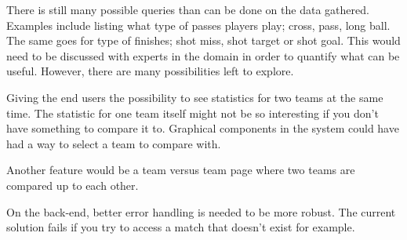 There is still many possible queries than can be done on the data gathered. Examples include listing what type of passes players play; cross, pass, long ball. The same goes for type of finishes; shot miss, shot target or shot goal. This would need to be discussed with experts in the domain in order to quantify what can be useful. However, there are many possibilities left to explore. 

Giving the end users the possibility to see statistics for two teams at the same time. The statistic for one team itself might not be so interesting if you don't have something to compare it to. Graphical components in the system could have had a way to select a team to compare with.

Another feature would be a team versus team page where two teams are compared up to each other.

On the back-end, better error handling is needed to be more robust. The current solution fails if you try to access a match that doesn't exist for example. 





